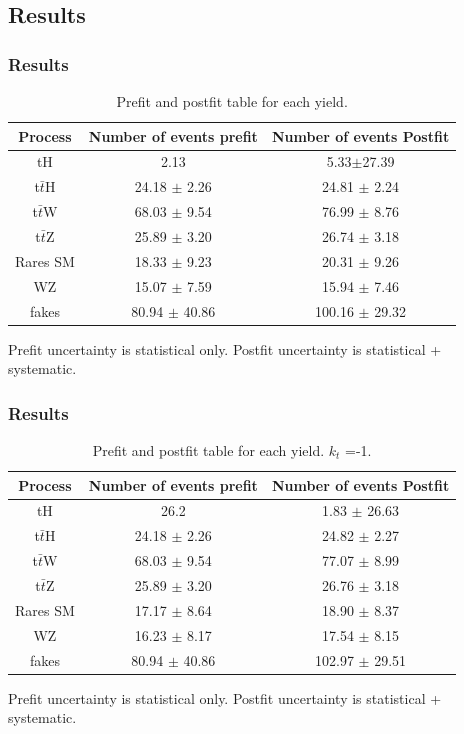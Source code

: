 \documentclass[11pt]{beamer}
\begin{document}
\begin{frame}
\section{Results}
\frametitle{Results}
\begin{table}
	\caption{Prefit and postfit table for each yield.}
\begin{tabular}{|c|c|c|}
	\hline
	Process  & Number of events prefit    & Number of events Postfit \\
	\hline
	tH & 2.13   & 5.33$\pm$27.39\\
	\hline
	t$\bar{t}$H  &  24.18 $\pm$ 2.26 & 24.81 $\pm$ 2.24 \\
	\hline
	t$\bar{t}$W  &  68.03 $\pm$ 9.54 & 76.99 $\pm$ 8.76\\
	\hline
	t$\bar{t}$Z  & 25.89 $\pm$ 3.20 & 26.74 $\pm$ 3.18\\
	\hline
	Rares SM & 18.33 $\pm$ 9.23 & 20.31 $\pm$ 9.26\\
	\hline
	WZ & 15.07 $\pm$ 7.59 & 15.94 $\pm$ 7.46\\
	\hline
	fakes  & 80.94 $\pm$ 40.86  & 100.16 $\pm$ 29.32\\
	\hline
\end{tabular}	
\end{table}
 Prefit uncertainty is statistical only. Postfit uncertainty is statistical + systematic.
\end{frame}


\begin{frame}
\frametitle{Results}

\begin{table}
\caption{Prefit and postfit table for each yield. $k_{t}$ =-1.}
	\begin{tabular}{|c|c|c|}
		\hline
		Process  & Number of events prefit    & Number of events Postfit \\
		\hline
		tH & 26.2 & 1.83 $\pm$ 26.63\\
		\hline
		t$\bar{t}$H  & 24.18 $\pm$ 2.26& 24.82 $\pm$ 2.27\\
		\hline
		t$\bar{t}$W  & 68.03  $\pm$ 9.54 & 77.07 $\pm$ 8.99\\
		\hline
		t$\bar{t}$Z  & 25.89  $\pm$  3.20& 26.76 $\pm$ 3.18\\
		\hline
		Rares SM & 17.17  $\pm$ 8.64 & 18.90 $\pm$ 8.37\\
		\hline
		WZ & 16.23  $\pm$ 8.17& 17.54 $\pm$ 8.15\\
		\hline
		fakes  & 80.94   $\pm$ 40.86& 102.97 $\pm$ 29.51\\
		\hline
	\end{tabular}	
\end{table}
 Prefit uncertainty is statistical only. Postfit uncertainty is statistical + systematic.
\end{frame}
\end{document}
